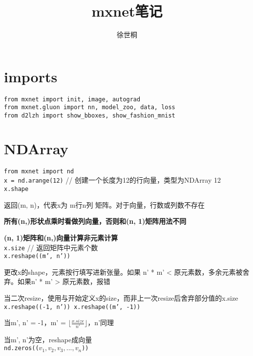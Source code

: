 \documentclass[UTF8]{ctexart}
\title{mxnet笔记}
\author{徐世桐}
\date{}
\begin{document}
\maketitle

\section{imports}
\noindent \texttt{from mxnet import init, image, autograd}\\
\texttt{from mxnet.gluon import nn, model\_zoo, data, loss}\\
\texttt{from d2lzh import show\_bboxes, show\_fashion\_mnist}

\section{NDArray}

\noindent \texttt{from mxnet import nd}\\
\texttt{x = nd.arange(12)} // 创建一个长度为12的行向量，类型为NDArray 12\\
\texttt{x.shape}
  
  返回(m, n)，代表x为 m行n列 矩阵。对于向量，行数或列数不存在

  \textbf{所有(n,)形状点乘时看做列向量，否则和(n, 1)矩阵用法不同}
  
  \textbf{(n, 1)矩阵和(n,)向量计算非元素计算}\\
\texttt{x.size} // 返回矩阵中元素个数\\
\texttt{x.reshape((m', n'))}

  更改x的shape，元素按行填写进新张量。如果 n' * m' < 原元素数，多余元素被舍弃。如果n' * m' > 原元素数，报错

  当二次resize，使用与开始定义x的size，而非上一次resize后舍弃部分值的x.size\\
\texttt{x.reshape((-1, n')) x.reshape((m', -1))}
 
  当m', n' = -1，m' = $\lfloor \frac{x.size}{n'}\rfloor $，n'同理

  当m', n'为空，reshape成向量\\
\texttt{nd.zeros(($v_1, v_2, v_3, ..., v_n$))}
  
\end{document}
